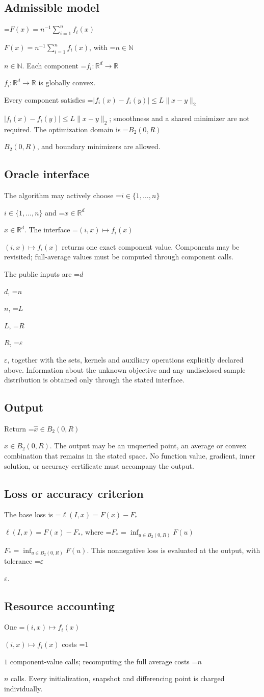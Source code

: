 \documentclass[10pt,a4paper]{article}
\newcommand{\AtlasMath}[1]{\par\begingroup\centering\setbox0=\hbox{$\displaystyle #1$}\ifdim\wd0>1.4\linewidth\typeout{ATLAS WIDE FORMULA: \the\wd0}\fi\ifdim\wd0>\linewidth\resizebox{\linewidth}{!}{\box0}\else\box0\fi\par\endgroup}
\newcommand{\AtlasInlineMath}[1]{\begingroup\setbox0=\hbox{$#1$}\ifdim\wd0>.4\linewidth\endgroup\AtlasMath{#1}\else\endgroup$#1$\fi}
\begin{document}
\subsection{Admissible model}
\AtlasInlineMath{F(x)=n^{-1}\sum_{i=1}^n f_i(x)}, with \AtlasInlineMath{n\in\mathbb{N}}. Each component \AtlasInlineMath{f_i:\mathbb{R}^d\to\mathbb{R}} is globally convex.

Every component satisfies \AtlasInlineMath{|f_i(x)-f_i(y)|\le L\|x-y\|_2}; smoothness and a shared minimizer are not required. The optimization domain is \AtlasInlineMath{B_2(0,R)}, and boundary minimizers are allowed.

\subsection{Oracle interface}
The algorithm may actively choose \AtlasInlineMath{i\in\{1,\ldots,n\}} and \AtlasInlineMath{x\in\mathbb{R}^d}. The interface \AtlasInlineMath{(i,x)\mapsto f_i(x)} returns one exact component value. Components may be revisited; full-average values must be computed through component calls.

The public inputs are \AtlasInlineMath{d}, \AtlasInlineMath{n}, \AtlasInlineMath{L}, \AtlasInlineMath{R}, \AtlasInlineMath{\varepsilon}, together with the sets, kernels and auxiliary operations explicitly declared above. Information about the unknown objective and any undisclosed sample distribution is obtained only through the stated interface.

\subsection{Output}
Return \AtlasInlineMath{\widehat{x}\in B_2(0,R)}. The output may be an unqueried point, an average or convex combination that remains in the stated space. No function value, gradient, inner solution, or accuracy certificate must accompany the output.

\subsection{Loss or accuracy criterion}
The base loss is \AtlasInlineMath{\ell(I,x)=F(x)-F_*}, where \AtlasInlineMath{F_*=\inf_{u\in B_2(0,R)}F(u)}. This nonnegative loss is evaluated at the output, with tolerance \AtlasInlineMath{\varepsilon}.

\subsection{Resource accounting}
One \AtlasInlineMath{(i,x)\mapsto f_i(x)} costs \AtlasInlineMath{1} component-value calls; recomputing the full average costs \AtlasInlineMath{n} calls. Every initialization, snapshot and differencing point is charged individually.
\end{document}
